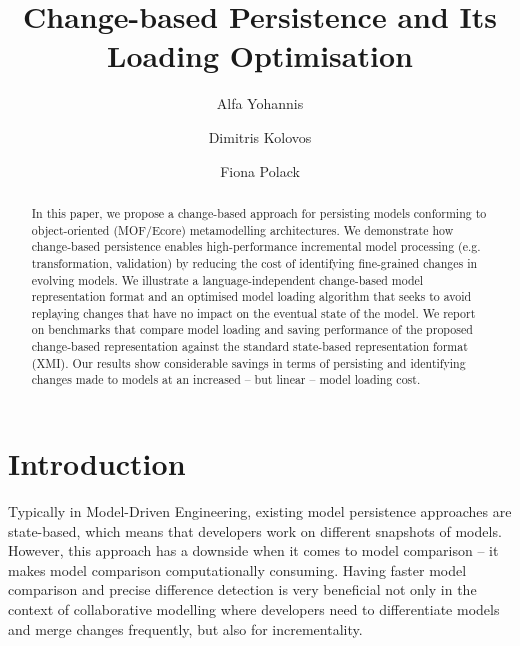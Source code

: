 \documentclass{llncs}
\begin{document}
\renewcommand{\thelstlisting}{\arabic{lstlisting}}
\renewcommand{\labelitemi}{$\bullet$}
\newcommand{\dk}[1]{\textbf{[DK: #1]}}

\title{Change-based Persistence and Its Loading Optimisation}
%
%
\author{Alfa Yohannis \and Dimitris Kolovos \and Fiona Polack }
%
%
%

\maketitle              %

\begin{abstract}
In this paper, we propose a change-based approach for persisting models conforming to object-oriented (MOF/Ecore) metamodelling architectures. We demonstrate how change-based persistence enables high-performance incremental model processing (e.g. transformation, validation) by reducing the cost of identifying fine-grained changes in evolving models. We illustrate a language-independent change-based model representation format and an optimised model loading algorithm that seeks to avoid replaying changes that have no impact on the eventual state of the model. We report on benchmarks that compare model loading and saving performance of the proposed change-based representation against the standard state-based representation format (XMI). Our results show considerable savings in terms of persisting and identifying changes made to models at an increased -- but linear -- model loading cost.
\end{abstract}

\section{Introduction}
\label{sec:introduction}


Typically in Model-Driven Engineering, existing model persistence approaches are state-based, which means that developers work on different snapshots of models. However, this approach has a downside when it comes to model comparison -- it makes model comparison computationally consuming. Having faster model comparison and precise difference detection is very beneficial not only in the context of collaborative modelling where developers need to differentiate models and merge changes frequently, but also for incrementality. 
\end{document}
